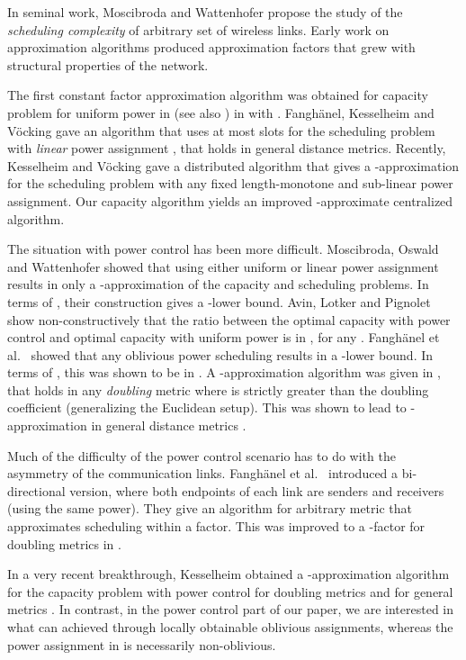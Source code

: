 \documentclass[11pt]{amsart}
\begin{document}
In seminal work, Moscibroda and Wattenhofer \cite{MoWa06}
propose the study of the \emph{scheduling complexity} of arbitrary set
of wireless links. 
Early work on approximation algorithms
\cite{moscibroda06b,MoscibrodaOW07,chafekar07} produced approximation
factors that grew with structural properties of the network.


The first constant factor approximation algorithm was obtained for
capacity problem for uniform power in \cite{GHWW09} (see also
\cite{HW09}) in  with .
Fangh\"anel, Kesselheim and V\"ocking \cite{FKV09} gave an algorithm
that uses at most  slots for the scheduling problem
with \emph{linear} power assignment ,
that holds in general distance metrics.
Recently, Kesselheim and V\"ocking \cite{KV10} gave a distributed
algorithm that gives a -approximation for the scheduling
problem with any fixed length-monotone and sub-linear power assignment.
Our capacity algorithm yields an improved -approximate
centralized algorithm.

The situation with power control has been more difficult.
Moscibroda, Oswald and Wattenhofer \cite{MoscibrodaOW07} showed that
using either uniform or linear power assignment results in only a 
-approximation of the capacity and scheduling problems.
In terms of , their construction gives a -lower bound. 
Avin, Lotker and Pignolet \cite{ALP09} show non-constructively that 
the ratio between the optimal capacity with power control and optimal
capacity with uniform power is  in , for any .
Fangh\"anel et al.~\cite{FKRV09} showed that any oblivious power
scheduling results in a -lower bound. In terms of , this
was shown to be  in \cite{us:esa09full}.
A -approximation algorithm was given
in \cite{us:esa09full}, that holds in any \emph{doubling} metric where
 is strictly greater than the doubling coefficient
(generalizing the Euclidean setup).
This was shown to lead to -approximation in general distance metrics \cite{FV09}.

Much of the difficulty of the power control scenario has to do with
the asymmetry of the communication links. Fangh\"anel et al.~\cite{FKRV09} 
introduced a bi-directional version, where both endpoints
of each link are senders and receivers (using the same power).
They give an algorithm for arbitrary metric 
that approximates scheduling within a  factor.
This was improved to a -factor for doubling metrics in
\cite{us:esa09full}. 

In a very recent breakthrough, Kesselheim obtained 
a -approximation algorithm
for the capacity problem with power control for doubling metrics
and  for general metrics \cite{KesselheimSoda11}. 
In contrast, in the power control part of our
paper, we are interested in what can achieved through locally
obtainable oblivious assignments, whereas the power assignment in
\cite{KesselheimSoda11} is necessarily non-oblivious.
\end{document}
